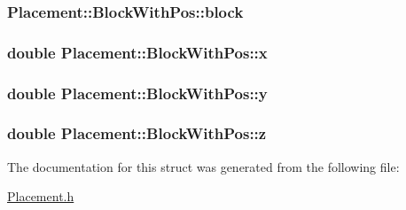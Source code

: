 \subsubsection[{block}]{ Placement\+::\+Block\+With\+Pos\+::block}\label{structPlacement_1_1BlockWithPos_a152d1b38cdbe97057acf2ecb586c9d4e}
\hypertarget{structPlacement_1_1BlockWithPos_a9bead5b77b52b62474f1533c51bc9ff1}{}
\subsubsection[{x}]{\setlength{\rightskip}{0pt plus 5cm}double Placement\+::\+Block\+With\+Pos\+::x}\label{structPlacement_1_1BlockWithPos_a9bead5b77b52b62474f1533c51bc9ff1}
\hypertarget{structPlacement_1_1BlockWithPos_acf2edddd35e7a041a454756157f063b1}{}
\subsubsection[{y}]{\setlength{\rightskip}{0pt plus 5cm}double Placement\+::\+Block\+With\+Pos\+::y}\label{structPlacement_1_1BlockWithPos_acf2edddd35e7a041a454756157f063b1}
\hypertarget{structPlacement_1_1BlockWithPos_a31b55f7655dfeebab414dc668eb4d1c2}{}
\subsubsection[{z}]{\setlength{\rightskip}{0pt plus 5cm}double Placement\+::\+Block\+With\+Pos\+::z}\label{structPlacement_1_1BlockWithPos_a31b55f7655dfeebab414dc668eb4d1c2}


The documentation for this struct was generated from the following file\+:\begin{DoxyCompactItemize}
\item 
\hyperlink{Placement_8h}{Placement.\+h}\end{DoxyCompactItemize}
